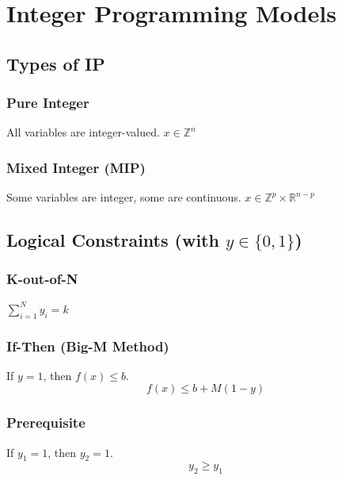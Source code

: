 \section{Integer Programming Models}

\subsection{Types of IP}
\subsubsection*{Pure Integer}
All variables are integer-valued.
$x \in \mathbb{Z}^n$

\subsubsection*{Mixed Integer (MIP)}
Some variables are integer, some are continuous.
$x \in \mathbb{Z}^p \times \mathbb{R}^{n-p} $

\subsection{Logical Constraints (with $y \in \{0, 1\}$)}

\subsubsection*{K-out-of-N}
$\sum_{i=1}^N y_i = k$

\subsubsection*{If-Then (Big-M Method)}
If $y=1$, then $f(x) \le b$.
\[ f(x) \le b + M(1-y) \]

\subsubsection*{Prerequisite}
If $y_1=1$, then $y_2=1$.
\[ y_2 \ge y_1 \]